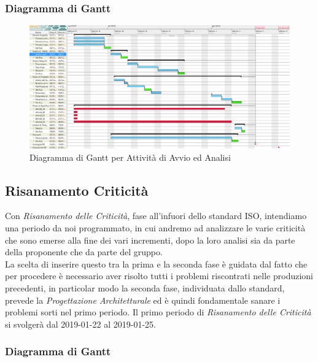 \newpage
\begin{landscape}
\subsubsection{Diagramma di Gantt}
\begin{figure}[H]
	\centering
  		\includegraphics[width=1.0\linewidth]{./images/AvvioAnalisi.png}
  		\caption{Diagramma di Gantt per Attività di Avvio ed Analisi}
  		\label{fig:Gantt Avvio ed Analisi}
\end{figure}
\end{landscape}
\newpage


\subsection{Risanamento Criticità}
\label{RC1}

Con \textit{Risanamento delle Criticità}, fase all'infuori dello standard ISO, intendiamo una periodo da noi programmato, in cui andremo ad analizzare le varie criticità che sono emerse alla fine dei vari incrementi, dopo la loro analisi sia da parte della proponente che da parte del gruppo. \\
La scelta di inserire questo tra la prima e la seconda fase è guidata dal fatto che per procedere è necessario aver risolto tutti i problemi riscontrati nelle produzioni precedenti, in particolar modo la seconda fase, individuata dallo standard, prevede la \textit{Progettazione Architetturale} ed è quindi fondamentale sanare i problemi sorti nel primo periodo. 
Il primo periodo di \textit{Risanamento delle Criticità} si svolgerà dal 2019-01-22 al 2019-01-25.

\subsubsection{Diagramma di Gantt}


